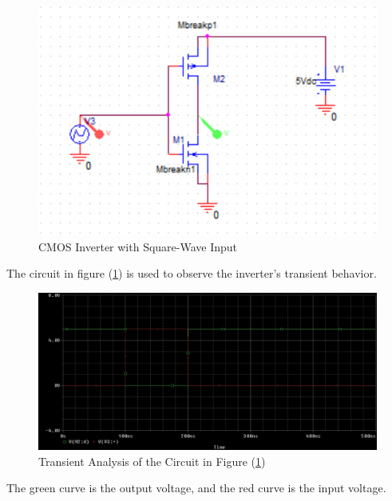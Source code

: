 \FloatBarrier

\begin{figure}[h!]
	\centering
	\includegraphics[scale=0.75]{../images/circuit2.PNG}
	\caption{CMOS Inverter with Square-Wave Input}
	\label{fig:circuit2}
\end{figure}

\FloatBarrier

The circuit in figure (\ref{fig:circuit2}) is used to observe the inverter's transient behavior.

\FloatBarrier

\begin{figure}[h!]
	\centering
	\includegraphics[scale=0.75]{../images/circuit2_transient.PNG}
	\caption{Transient Analysis of the Circuit in Figure (\ref{fig:circuit2})}
	\label{fig:circuit2_transient}
\end{figure}

\FloatBarrier

{\footnotesize The green curve is the output voltage, and the red curve is the input voltage.}

\FloatBarrier

